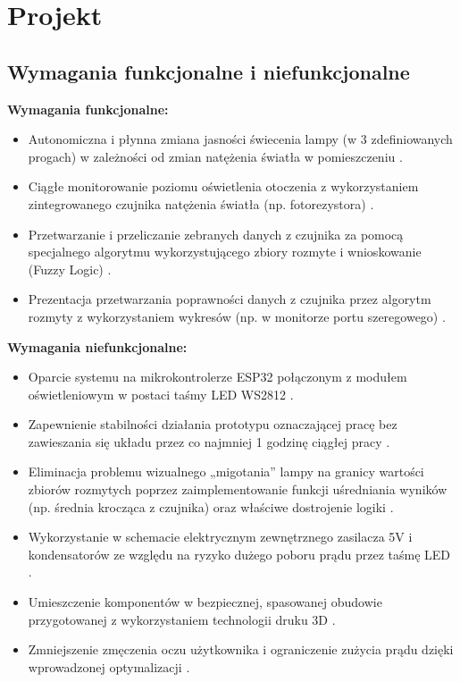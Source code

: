 \chapter{Projekt}

\section{Wymagania funkcjonalne i niefunkcjonalne}

\textbf{Wymagania funkcjonalne:}
\begin{itemize}
\item Autonomiczna i płynna zmiana jasności świecenia lampy (w 3 zdefiniowanych progach) w zależności od zmian natężenia światła w pomieszczeniu \cite{karta_projektu}.
\item Ciągłe monitorowanie poziomu oświetlenia otoczenia z wykorzystaniem zintegrowanego czujnika natężenia światła (np. fotorezystora) \cite{karta_projektu}.
\item Przetwarzanie i przeliczanie zebranych danych z czujnika za pomocą specjalnego algorytmu wykorzystującego zbiory rozmyte i wnioskowanie (Fuzzy Logic) \cite{karta_projektu}.
\item Prezentacja przetwarzania poprawności danych z czujnika przez algorytm rozmyty z wykorzystaniem wykresów (np. w monitorze portu szeregowego) \cite{karta_projektu}.
\end{itemize}

\textbf{Wymagania niefunkcjonalne:}
\begin{itemize}
\item Oparcie systemu na mikrokontrolerze ESP32 połączonym z modułem oświetleniowym w postaci taśmy LED WS2812 \cite{karta_projektu}.
\item Zapewnienie stabilności działania prototypu oznaczającej pracę bez zawieszania się układu przez co najmniej 1 godzinę ciągłej pracy \cite{karta_projektu}.
\item Eliminacja problemu wizualnego „migotania” lampy na granicy wartości zbiorów rozmytych poprzez zaimplementowanie funkcji uśredniania wyników (np. średnia krocząca z czujnika) oraz właściwe dostrojenie logiki \cite{karta_projektu}.
\item Wykorzystanie w schemacie elektrycznym zewnętrznego zasilacza 5V i kondensatorów ze względu na ryzyko dużego poboru prądu przez taśmę LED \cite{karta_projektu}.
\item Umieszczenie komponentów w bezpiecznej, spasowanej obudowie przygotowanej z wykorzystaniem technologii druku 3D \cite{karta_projektu}.
\item Zmniejszenie zmęczenia oczu użytkownika i ograniczenie zużycia prądu dzięki wprowadzonej optymalizacji \cite{karta_projektu}.
\end{itemize}

